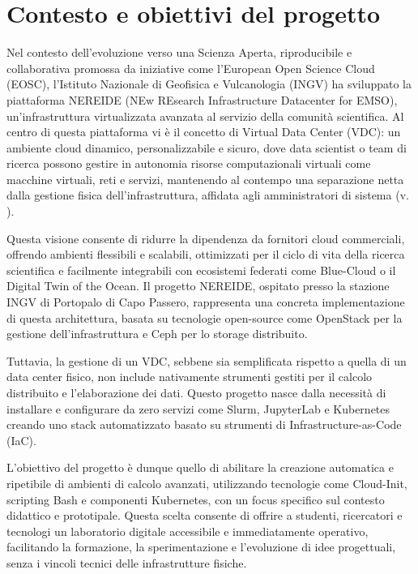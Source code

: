 \documentclass[12pt,a4paper,openright,twoside]{book}
\begin{document}
\section{Contesto e obiettivi del progetto}
Nel contesto dell'evoluzione verso una Scienza Aperta, riproducibile e collaborativa promossa da iniziative come l'European Open Science Cloud (EOSC),
l'Istituto Nazionale di Geofisica e Vulcanologia (INGV) ha sviluppato la piattaforma NEREIDE (NEw REsearch Infrastructure Datacenter for EMSO),
un'infrastruttura virtualizzata avanzata al servizio della comunità scientifica.
Al centro di questa piattaforma vi è il concetto di Virtual Data Center (VDC): 
un ambiente cloud dinamico, personalizzabile e sicuro, dove data scientist o team di ricerca possono gestire in autonomia risorse computazionali virtuali come
macchine virtuali, reti e servizi, mantenendo al contempo una separazione netta dalla gestione fisica dell'infrastruttura, affidata agli amministratori di sistema (v. ).

Questa visione consente di ridurre la dipendenza da fornitori cloud commerciali, offrendo ambienti flessibili e scalabili, ottimizzati per il ciclo di vita della ricerca scientifica
e facilmente integrabili con ecosistemi federati come Blue-Cloud o il Digital Twin of the Ocean.
Il progetto NEREIDE, ospitato presso la stazione INGV di Portopalo di Capo Passero, rappresenta una concreta implementazione di questa architettura,
basata su tecnologie open-source come OpenStack per la gestione dell'infrastruttura e Ceph per lo storage distribuito\cite{cacciaguerra2024vdc}.

Tuttavia, la gestione di un VDC, sebbene sia semplificata rispetto a quella di un data center fisico, non include nativamente strumenti gestiti per il calcolo distribuito
e l'elaborazione dei dati. Questo progetto nasce dalla necessità di installare e configurare da zero servizi come Slurm, JupyterLab e Kubernetes creando uno stack automatizzato
basato su strumenti di Infrastructure-as-Code (IaC).

L'obiettivo del progetto è dunque quello di abilitare la creazione automatica e ripetibile di ambienti di calcolo avanzati, utilizzando tecnologie come Cloud-Init,
scripting Bash e componenti Kubernetes, con un focus specifico sul contesto didattico e prototipale. 
Questa scelta consente di offrire a studenti, ricercatori e tecnologi un laboratorio digitale accessibile e immediatamente operativo, facilitando la formazione,
la sperimentazione e l'evoluzione di idee progettuali, senza i vincoli tecnici delle infrastrutture fisiche.
\end{document}

